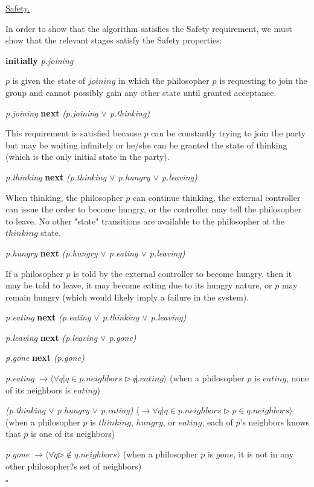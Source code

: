 \documentclass[11pt]{article}
\newenvironment{solution}{\noindent{\bf Solution.} }{

\hfill$\square$}
\begin{document}
\begin{solution}
\indent


\underline{\large{Safety.}}

In order to show that the algorithm satisfies the Safety requirement, we must show that the relevant stages satisfy the Safety properties:

{\bfseries initially} {\it p.joining}

\indent $p$ is given the state of $joining$ in which the philosopher $p$ is requesting to join the group and cannot possibly gain any other state until granted acceptance.

{\it p.joining} {\bfseries next} {\it (p.joining $\vee$ p.thinking)}

\indent This requirement is satisfied because $p$ can be constantly trying to join the party but may be waiting infinitely or he/she can be granted the state of thinking (which is the only initial state in the party).

{\it p.thinking} {\bfseries next} {\it (p.thinking $\vee$ p.hungry $\vee$ p.leaving)}

\indent When thinking, the philosopher $p$ can continue thinking, the external controller can issue the order to become hungry, or the controller may tell the philosopher to leave. No other "state" transitions are available to the philosopher at the $thinking$ state. 

{\it p.hungry} {\bfseries next} {\it (p.hungry $\vee$ p.eating $\vee$ p.leaving)}

\indent If a philosopher $p$ is told by the external controller to become hungry, then it may be told to leave, it may become eating due to its hungry nature, or $p$ may remain hungry (which would likely imply a failure in the system).

{\it p.eating} {\bfseries next} {\it (p.eating $\vee$ p.thinking $\vee$ p.leaving)}

\indent

{\it p.leaving} {\bfseries next} {\it (p.leaving $\vee$ p.gone)}

\indent

{\it p.gone} {\bfseries next} {\it (p.gone)}

\indent

{\it p.eating} $\rightarrow \langle \forall q | q \in p.neighbors \rhd \not q.eating \rangle$
(when a philosopher $p$ is $eating$, none of its neighbors is $eating$)

\indent 

{\it (p.thinking $\vee$ p.hungry $\vee$ p.eating)} $\langle \rightarrow \forall q | q \in p.neighbors \rhd p \in q.neighbors \rangle$
(when a philosopher $p$ is $thinking$, $hungry$, or $eating$, each of $p$'s neighbors knows that $p$ is one of its neighbors)

\indent

{\it p.gone} $\rightarrow \langle \forall q  \rhd \not\in q.neighbors \rangle$
(when a philosopher $p$ is $gone$, it is not in any other philosopher?s set of neighbors)

\indent

\end{solution}
\end{document}
